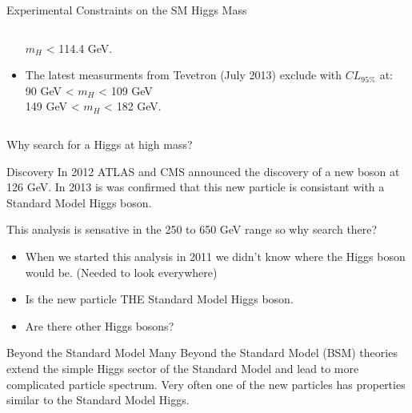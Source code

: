 \begin{frame}{Experimental Constraints on the SM Higgs Mass}
\begin{center}
\begin{columns}
\begin{column}{0.5\textwidth}
\begin{itemize}
  \vspace{.5em}
  $m_H$ < 114.4 GeV.\\
  \vspace{1em}
\item
  The latest measurments from Tevetron (July 2013) exclude with $CL_{95\%}$ at:\\
  \vspace{.5em}
  90 GeV < $m_H$ < 109 GeV\\
  149 GeV < $m_H$ < 182 GeV.
\end{itemize}
\end{column}
\end{columns}
\end{center}
\end{frame}

\begin{frame}{Why search for a Higgs at high mass?}
\begin{block}{Discovery}
In 2012 ATLAS and CMS announced the discovery of a new boson at 126 GeV.  In 2013 is was confirmed that this new particle is consistant with a Standard Model Higgs boson.
\end{block}
This analysis is sensative in the 250 to 650 GeV range so why search there?
\begin{itemize}
\item
When we started this analysis in 2011 we didn't know where the Higgs boson would be. (Needed to look everywhere)
\item
Is the new particle THE Standard Model Higgs boson.
\item
Are there other Higgs bosons?
\end{itemize}
\footnotesize
\begin{block}{Beyond the Standard Model}
Many Beyond the Standard Model (BSM) theories extend the simple Higgs sector of the Standard Model and lead to more complicated particle spectrum. Very often one of the new particles has properties similar to the Standard Model Higgs.
\end{block}
\end{frame}







